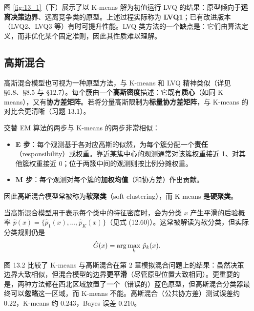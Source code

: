 \begin{remark}
图 \ref{fig:13_1}（下）展示了以 K-means 解为初值运行 LVQ 的结果：原型倾向于\textbf{远离决策边界}、远离竞争类的原型。上述过程实际称为 \textbf{LVQ1}；已有改进版本（LVQ2、LVQ3 等）有时可提升性能。LVQ 类方法的一个缺点是：它们由算法定义，而非优化某个固定准则，因此其性质难以理解。
\end{remark}

\subsection{高斯混合}

高斯混合模型也可视为一种原型方法，与 K-means 和 LVQ 精神类似（详见 §6.8、§8.5 与 §12.7）。每个簇由一个\textbf{高斯密度}描述：它既有\textbf{质心}（如同 K-means），又有\textbf{协方差矩阵}。若将分量高斯限制为\textbf{标量协方差矩阵}，与 K-means 的对比会更清晰（习题 13.1）。

交替 EM 算法的两步与 K-means 的两步非常相似：

\begin{itemize}[itemsep=1pt]
\item \textbf{E 步}：每个观测基于各对应高斯的似然，为每个簇分配一个\textbf{责任}（responsibility）或权重。靠近某簇中心的观测通常对该簇权重接近 1、对其他簇权重接近 0；位于两簇中间的观测则按比例分摊权重。
\item \textbf{M 步}：每个观测对每个簇的\textbf{加权均值}（和协方差）作出贡献。
\end{itemize}

因此高斯混合模型常被称为\textbf{软聚类}（soft clustering），而 K-means 是\textbf{硬聚类}。

\begin{remark}[软分类的实质]
当高斯混合模型用于表示每个类中的特征密度时，会为分类 $x$ 产生平滑的后验概率 $\hat{p}(x)=\{\hat{p}_1(x),\dots,\hat{p}_K(x)\}$（见式 (12.60)）。这常被解读为软分类，但实际分类规则仍是
\begin{equation}
\hat{G}(x) = \arg\max_{k}\, \hat{p}_k(x).
\end{equation}

图 13.2 比较了 K-means 与高斯混合在第 2 章模拟混合问题上的结果：虽然决策边界大致相似，但混合模型的边界\textbf{更平滑}（尽管原型位置大致相同）。更重要的是，两种方法都在西北区域放置了一个（错误的）蓝色原型，但高斯混合分类器最终可以\textbf{忽略}这一区域，而 K-means 不能。高斯混合（公共协方差）测试误差约 $0.22$，K-means 约 $0.243$，Bayes 误差 $0.210$。
\end{remark}

